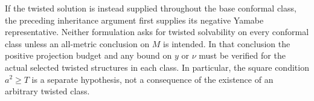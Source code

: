 If the twisted solution is instead supplied throughout the base
conformal class, the preceding inheritance argument first supplies its
negative Yamabe representative.  Neither formulation asks for twisted
solvability on every conformal class unless an all-metric conclusion on
$M$ is intended.  In that conclusion the positive projection budget and
any bound on $y$ or $\nu$ must be verified for the actual selected
twisted structures in each class.  In particular, the square condition
$a^2\ge T$ is a separate hypothesis, not a consequence of the existence
of an arbitrary twisted class.
